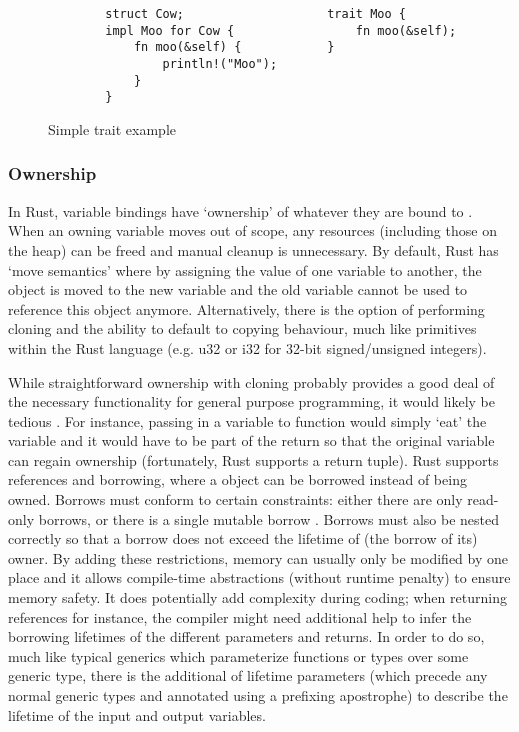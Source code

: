 \begin{figure}[H]
\centering
\begin{verbatim}
        struct Cow;                    trait Moo {
        impl Moo for Cow {                 fn moo(&self);    
            fn moo(&self) {            }
                println!("Moo");                     
            }
        }
\end{verbatim}
\caption{Simple trait example}
\end{figure}


\subsubsection{Ownership}
In Rust, variable bindings have `ownership' of whatever they are bound to \cite{docowner15}\cite{rustbook15}. When an owning variable moves out of scope, any resources (including those on the heap) can be freed and manual cleanup is unnecessary. By default, Rust has `move semantics' where by assigning the value of one variable to another, the object is moved to the new variable and the old variable cannot be used to reference this object anymore. Alternatively, there is the option of performing cloning and the ability to default to copying behaviour, much like primitives within the Rust language (e.g. u32 or i32 for 32-bit signed/unsigned integers).

While straightforward ownership with cloning probably provides a good deal of the necessary functionality for general purpose programming, it would likely be tedious \cite{docowner15}. For instance, passing in a variable to function would simply `eat' the variable and it would have to be part of the return so that the original variable can regain ownership (fortunately, Rust supports a return tuple). Rust supports references and borrowing, where a object can be borrowed instead of being owned. Borrows must conform to certain constraints: either there are only read-only borrows, or there is a single mutable borrow \cite{docborrow15}. Borrows must also be nested correctly so that a borrow does not exceed the lifetime of (the borrow of its) owner. By adding these restrictions, memory can usually only be modified by one place and it allows compile-time abstractions (without runtime penalty) to ensure memory safety. It does potentially add complexity during coding; when returning references for instance, the compiler might need additional help to infer the borrowing lifetimes of the different parameters and returns. In order to do so, much like typical generics which parameterize functions or types over some generic type, there is the additional of lifetime parameters (which precede any normal generic types and annotated using a prefixing apostrophe) to describe the lifetime of the input and output variables.


